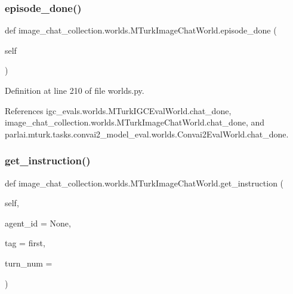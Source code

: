 \subsubsection{\texorpdfstring{episode\+\_\+done()}{episode\_done()}}
{\footnotesize\ttfamily def image\+\_\+chat\+\_\+collection.\+worlds.\+M\+Turk\+Image\+Chat\+World.\+episode\+\_\+done (\begin{DoxyParamCaption}\item[{}]{self }\end{DoxyParamCaption})}



Definition at line 210 of file worlds.\+py.



References igc\+\_\+evals.\+worlds.\+M\+Turk\+I\+G\+C\+Eval\+World.\+chat\+\_\+done, image\+\_\+chat\+\_\+collection.\+worlds.\+M\+Turk\+Image\+Chat\+World.\+chat\+\_\+done, and parlai.\+mturk.\+tasks.\+convai2\+\_\+model\+\_\+eval.\+worlds.\+Convai2\+Eval\+World.\+chat\+\_\+done.

\mbox{\label{classimage__chat__collection_1_1worlds_1_1MTurkImageChatWorld_ab3caeb29dc340a476579b1cc8d101608}} 
\subsubsection{\texorpdfstring{get\+\_\+instruction()}{get\_instruction()}}
{\footnotesize\ttfamily def image\+\_\+chat\+\_\+collection.\+worlds.\+M\+Turk\+Image\+Chat\+World.\+get\+\_\+instruction (\begin{DoxyParamCaption}\item[{}]{self,  }\item[{}]{agent\+\_\+id = {\ttfamily None},  }\item[{}]{tag = {\ttfamily \textquotesingle{}first\textquotesingle{}},  }\item[{}]{turn\+\_\+num = {} }\end{DoxyParamCaption})}




